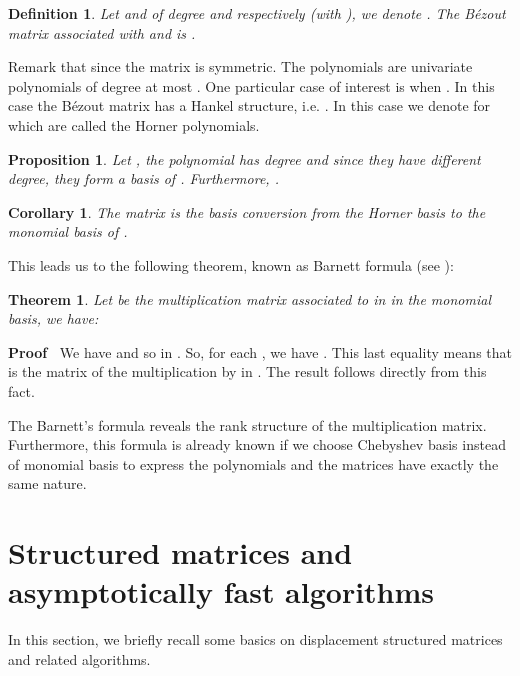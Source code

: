 \documentclass{article}
\newenvironment{proof}{\noindent\textbf{Proof\ }}{\hspace*{\fill}\medskip}
\newtheorem{corollary}{Corollary}
\newtheorem{definition}{Definition}
\newtheorem{proposition}{Proposition}
\newtheorem{theorem}{Theorem}
\begin{document}
\begin{definition}
  Let  and  of degree  and  respectively (with
  ), we denote . The
  B\'ezout matrix associated with  and  is .
\end{definition}

Remark that since  the matrix
 is symmetric. The polynomials  are univariate
polynomials of degree at most . One particular case of interest is when
. In this case the B\'ezout matrix has a Hankel structure, i.e.
. In this case we denote  for  which are called the
Horner polynomials.

\begin{proposition}
  Let , the polynomial  has degree  and since they have different
  degree, they form a basis of . Furthermore,
  .
\end{proposition}

\begin{corollary}
  The matrix  is the basis conversion from the Horner basis  to the monomial basis  of
  .
\end{corollary}

This leads us to the following theorem, known as Barnett formula (see
{\cite{B}}):

\begin{theorem}
  Let  be the multiplication matrix associated to  in  in the monomial basis, we have:
  
\end{theorem}

\begin{proof}
  We have  and so  in . So, for each
  , we have . This last equality means that  is the
  matrix of the multiplication by  in . The
  result follows directly from this fact.
\end{proof}

The Barnett's formula reveals the rank structure of the multiplication matrix.
Furthermore, this formula is already known if we choose Chebyshev basis
instead of monomial basis to express the polynomials and the matrices have
exactly the same nature. \



\section{Structured matrices and asymptotically fast algorithms}



In this section, we briefly recall some basics on displacement structured
matrices and related algorithms.
\end{document}
